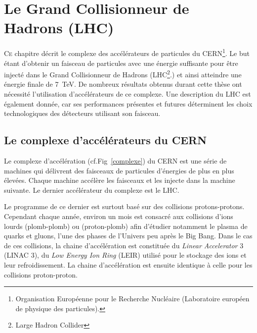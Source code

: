 \chapter{Le Grand Collisionneur de Hadrons (LHC)}
\renewcommand\chapterillustration{LHC/lhc}
\ThisULCornerWallPaper{1}{\chapterillustration}
\minitoc
\lettrine[lines=4, slope=-0.5em]{C}{e} chapitre décrit le complexe des accélérateurs de particules du CERN\footnote{Organisation Européenne pour le Recherche Nucléaire (Laboratoire européen de physique des particules).}. Le but étant d'obtenir un faisceau de particules avec une énergie suffisante pour être injecté dans le Grand Collisionneur de Hadrons (LHC\footnote{Large Hadron Collider}.) et ainsi atteindre une énergie finale de \SI{7}{\tera\eV}. De nombreux résultats obtenus durant cette thèse ont nécessité l'utilisation d'accélérateurs de ce complexe. Une description du LHC est également donnée, car ses performances présentes et futures déterminent les choix technologiques des détecteurs utilisant son faisceau.

\section{Le complexe d'accélérateurs du CERN}

Le complexe d'accélération (cf.Fig~\ref{complexe}) du CERN est une série de machines qui délivrent des faisceaux de particules d'énergies de plus en plus élevées. Chaque machine accélère les faisceaux et les injecte dans la machine suivante. Le dernier accélérateur du complexe est le LHC.

Le programme de ce dernier est surtout basé sur des collisions protons-protons. Cependant chaque année, environ un mois est consacré aux collisions d'ions lourds (plomb-plomb) ou (proton-plomb) afin d'étudier notamment le plasma de quarks et gluons, l'une des phases de l'Univers peu après le Big Bang. Dans le cas de ces collisions, la chaine d'accélération est constituée du \textit{Linear Accelerator} \num{3} (LINAC \num{3}), du \textit{Low Energy Ion Ring} (LEIR) utilisé pour le stockage des ions et leur refroidissement. La chaine d'accélération est ensuite identique à celle pour les collisions proton-proton.

